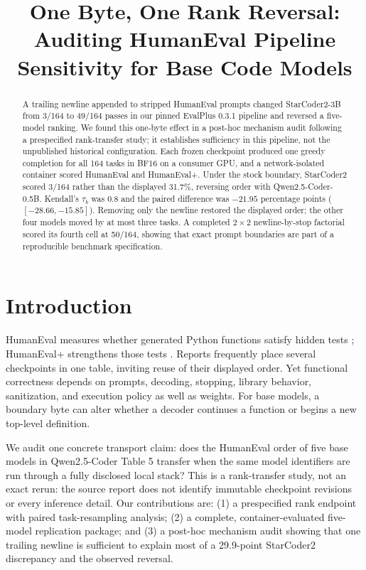 \documentclass[10pt,conference]{IEEEtran}
\title{One Byte, One Rank Reversal: Auditing HumanEval Pipeline Sensitivity for Base Code Models}
\author{\IEEEauthorblockN{Anonymous Author(s)}}
\begin{document}
\maketitle

\begin{abstract}
A trailing newline appended to stripped HumanEval prompts changed
StarCoder2-3B from 3/164 to 49/164 passes in our pinned EvalPlus 0.3.1 pipeline
and reversed a five-model ranking. We found this one-byte effect in a post-hoc
mechanism audit following a prespecified rank-transfer study; it establishes
sufficiency in this pipeline, not the unpublished historical configuration.
Each frozen checkpoint produced one greedy completion for all 164 tasks in BF16
on a consumer GPU, and a network-isolated container scored HumanEval and
HumanEval+. Under the stock boundary, StarCoder2 scored 3/164 rather than the
displayed 31.7\%, reversing order with Qwen2.5-Coder-0.5B. Kendall's $\tau_b$
was 0.8 and the paired difference was $-21.95$ percentage points
($[-28.66,-15.85]$). Removing only the newline restored the displayed order;
the other four models moved by at most three tasks. A completed $2\times2$
newline-by-stop factorial scored its fourth cell at 50/164, showing that exact
prompt boundaries are part of a reproducible benchmark specification.
\end{abstract}

\section{Introduction}
HumanEval measures whether generated Python functions satisfy hidden tests
\cite{chen2021humaneval}; HumanEval+ strengthens those tests
\cite{liu2023evalplus}. Reports frequently place several checkpoints in one
table, inviting reuse of their displayed order. Yet functional correctness
depends on prompts, decoding, stopping, library behavior, sanitization, and
execution policy as well as weights. For base models, a boundary byte can alter
whether a decoder continues a function or begins a new top-level definition.

We audit one concrete transport claim: does the HumanEval order of five base
models in Qwen2.5-Coder Table 5 \cite{hui2024qwen25coder} transfer when the same
model identifiers are run through a fully disclosed local stack? This is a
rank-transfer study, not an exact rerun: the source report does not identify
immutable checkpoint revisions or every inference detail. Our contributions are:
(1) a prespecified rank endpoint with paired task-resampling analysis; (2) a
complete, container-evaluated five-model replication package; and (3) a
post-hoc mechanism audit showing that one trailing newline is sufficient to
explain most of a 29.9-point StarCoder2 discrepancy and the observed reversal.
\end{document}
